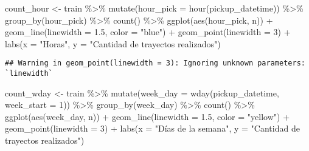 \documentclass[
]{article}
\newenvironment{Shaded}{\begin{snugshade}}{\end{snugshade}}
\newcommand{\AttributeTok}[1]{\textcolor[rgb]{0.77,0.63,0.00}{#1}}
\newcommand{\DecValTok}[1]{\textcolor[rgb]{0.00,0.00,0.81}{#1}}
\newcommand{\FloatTok}[1]{\textcolor[rgb]{0.00,0.00,0.81}{#1}}
\newcommand{\FunctionTok}[1]{\textcolor[rgb]{0.00,0.00,0.00}{#1}}
\newcommand{\NormalTok}[1]{#1}
\newcommand{\OtherTok}[1]{\textcolor[rgb]{0.56,0.35,0.01}{#1}}
\newcommand{\SpecialCharTok}[1]{\textcolor[rgb]{0.00,0.00,0.00}{#1}}
\newcommand{\StringTok}[1]{\textcolor[rgb]{0.31,0.60,0.02}{#1}}
\begin{document}
\begin{Shaded}
\begin{Highlighting}[]
\NormalTok{count\_hour }\OtherTok{\textless{}{-}}\NormalTok{ train }\SpecialCharTok{\%\textgreater{}\%}
  \FunctionTok{mutate}\NormalTok{(}\AttributeTok{hour\_pick =} \FunctionTok{hour}\NormalTok{(pickup\_datetime)) }\SpecialCharTok{\%\textgreater{}\%}
  \FunctionTok{group\_by}\NormalTok{(hour\_pick) }\SpecialCharTok{\%\textgreater{}\%}
  \FunctionTok{count}\NormalTok{() }\SpecialCharTok{\%\textgreater{}\%}
  \FunctionTok{ggplot}\NormalTok{(}\FunctionTok{aes}\NormalTok{(hour\_pick, n)) }\SpecialCharTok{+}
  \FunctionTok{geom\_line}\NormalTok{(}\AttributeTok{linewidth =} \FloatTok{1.5}\NormalTok{, }\AttributeTok{color =} \StringTok{"blue"}\NormalTok{) }\SpecialCharTok{+}
  \FunctionTok{geom\_point}\NormalTok{(}\AttributeTok{linewidth =} \DecValTok{3}\NormalTok{) }\SpecialCharTok{+} 
  \FunctionTok{labs}\NormalTok{(}\AttributeTok{x =} \StringTok{"Horas"}\NormalTok{, }\AttributeTok{y =} \StringTok{"Cantidad de trayectos realizados"}\NormalTok{)}
\end{Highlighting}
\end{Shaded}

\begin{verbatim}
## Warning in geom_point(linewidth = 3): Ignoring unknown parameters: `linewidth`
\end{verbatim}

\begin{Shaded}
\begin{Highlighting}[]
\NormalTok{count\_wday }\OtherTok{\textless{}{-}}\NormalTok{ train }\SpecialCharTok{\%\textgreater{}\%}
  \FunctionTok{mutate}\NormalTok{(}\AttributeTok{week\_day =} \FunctionTok{wday}\NormalTok{(pickup\_datetime, }\AttributeTok{week\_start =} \DecValTok{1}\NormalTok{)) }\SpecialCharTok{\%\textgreater{}\%}
  \FunctionTok{group\_by}\NormalTok{(week\_day) }\SpecialCharTok{\%\textgreater{}\%}
  \FunctionTok{count}\NormalTok{() }\SpecialCharTok{\%\textgreater{}\%}
  \FunctionTok{ggplot}\NormalTok{(}\FunctionTok{aes}\NormalTok{(week\_day, n)) }\SpecialCharTok{+}
  \FunctionTok{geom\_line}\NormalTok{(}\AttributeTok{linewidth =} \FloatTok{1.5}\NormalTok{, }\AttributeTok{color =} \StringTok{"yellow"}\NormalTok{) }\SpecialCharTok{+}
  \FunctionTok{geom\_point}\NormalTok{(}\AttributeTok{linewidth =} \DecValTok{3}\NormalTok{) }\SpecialCharTok{+} 
  \FunctionTok{labs}\NormalTok{(}\AttributeTok{x =} \StringTok{"Días de la semana"}\NormalTok{, }\AttributeTok{y =} \StringTok{"Cantidad de trayectos realizados"}\NormalTok{)}
\end{Highlighting}
\end{Shaded}
\end{document}
